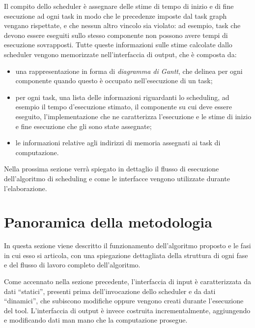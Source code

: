 Il compito dello scheduler è assegnare delle stime di tempo di inizio e di fine 
esecuzione ad ogni task in modo che le precedenze imposte dal task graph
vengano rispettate, e che nessun altro vincolo sia violato: ad esempio, 
task che devono essere eseguiti sullo stesso componente non possono avere tempi 
di esecuzione sovrapposti. Tutte queste informazioni sulle stime calcolate 
dallo scheduler vengono memorizzate nell'interfaccia di output, che è composta 
da:
\begin{itemize}
 \item una rappresentazione in forma di \emph{diagramma di Gantt}, che delinea 
per ogni componente quando questo è occupato nell'esecuzione di un task;
 \item per ogni task, una lista delle informazioni riguardanti lo scheduling, 
ad esempio il tempo d'esecuzione stimato, il componente su cui deve essere 
eseguito, l'implementazione che ne caratterizza l'esecuzione e le stime di 
inizio e fine esecuzione che gli sono state assegnate;
 \item le informazioni relative agli indirizzi di memoria assegnati ai task
 di computazione.
\end{itemize}

Nella prossima sezione verrà spiegato in dettaglio il flusso di 
esecuzione dell'algoritmo di scheduling e come le interfacce vengono 
utilizzate durante l'elaborazione.


\section{Panoramica della metodologia}
\label{sec:panoramicaMetodologia}

In questa sezione viene descritto il funzionamento dell'algoritmo proposto e le 
fasi in cui esso si articola, con una spiegazione dettagliata della struttura 
di ogni fase e del flusso di lavoro completo dell'algoritmo.

Come accennato nella sezione precedente, l'interfaccia di input è 
caratterizzata da dati ``statici'', presenti prima dell'invocazione dello 
scheduler e da dati ``dinamici'', che subiscono modifiche oppure vengono creati 
durante l'esecuzione del tool. L'interfaccia di output è invece costruita 
incrementalmente, aggiungendo e modificando dati man mano che la computazione 
prosegue.



